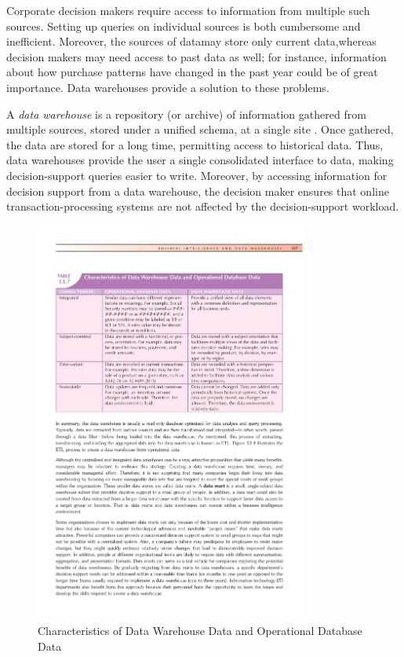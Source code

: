 \documentclass{vldb}
\begin{document}
Corporate decision makers require access to information from multiple such
sources. Setting up queries on individual sources is both cumbersome and inefficient.
Moreover, the sources of datamay store only current data,whereas decision
makers may need access to past data as well; for instance, information about how
purchase patterns have changed in the past year could be of great importance.
Data warehouses provide a solution to these problems.

A \textit{data warehouse} is a repository (or archive) of information gathered from
multiple sources, stored under a unified schema, at a single site \cite{Silberschatz:2010}. Once gathered,
the data are stored for a long time, permitting access to historical data. Thus,
data warehouses provide the user a single consolidated interface to data, making
decision-support queries easier to write. Moreover, by accessing information
for decision support from a data warehouse, the decision maker ensures that
online transaction-processing systems are not affected by the decision-support
workload.

\begin{figure}[htb]
\centering
\includegraphics[width=0.8\textwidth]{data-comparison}
\caption{Characteristics of Data Warehouse Data and Operational Database Data}
\label{fig:data-comparison}
\end{figure}
\end{document}
